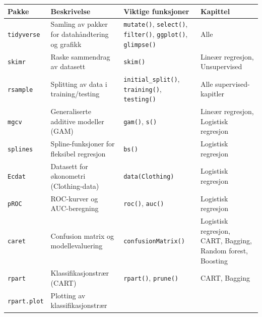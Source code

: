 \documentclass[
  letterpaper,
  DIV=11,
  numbers=noendperiod]{scrreprt}
\begin{document}
\begin{longtable}[]{@{}
  >{\raggedright\arraybackslash}p{}
  >{\raggedright\arraybackslash}p{}
  >{\raggedright\arraybackslash}p{}
  >{\raggedright\arraybackslash}p{}@{}}
\toprule\noalign{}
\begin{minipage}[b]{\linewidth}\raggedright
Pakke
\end{minipage} & \begin{minipage}[b]{\linewidth}\raggedright
Beskrivelse
\end{minipage} & \begin{minipage}[b]{\linewidth}\raggedright
Viktige funksjoner
\end{minipage} & \begin{minipage}[b]{\linewidth}\raggedright
Kapittel
\end{minipage} \\
\midrule\noalign{}
\endhead
\bottomrule\noalign{}
\endlastfoot
\texttt{tidyverse} & Samling av pakker for datahåndtering og grafikk &
\texttt{mutate()}, \texttt{select()}, \texttt{filter()},
\texttt{ggplot()}, \texttt{glimpse()} & Alle \\
\texttt{skimr} & Raske sammendrag av datasett & \texttt{skim()} & Lineær
regresjon, Unsupervised \\
\texttt{rsample} & Splitting av data i training/testing &
\texttt{initial\_split()}, \texttt{training()}, \texttt{testing()} &
Alle supervised-kapitler \\
\texttt{mgcv} & Generaliserte additive modeller (GAM) & \texttt{gam()},
\texttt{s()} & Lineær regresjon, Logistisk regresjon \\
\texttt{splines} & Spline-funksjoner for fleksibel regresjon &
\texttt{bs()} & Logistisk regresjon \\
\texttt{Ecdat} & Datasett for økonometri (Clothing-data) &
\texttt{data(Clothing)} & Logistisk regresjon \\
\texttt{pROC} & ROC-kurver og AUC-beregning & \texttt{roc()},
\texttt{auc()} & Logistisk regresjon \\
\texttt{caret} & Confusion matrix og modellevaluering &
\texttt{confusionMatrix()} & Logistisk regresjon, CART, Bagging, Random
forest, Boosting \\
\texttt{rpart} & Klassifikasjonstrær (CART) & \texttt{rpart()},
\texttt{prune()} & CART, Bagging \\
\texttt{rpart.plot} & Plotting av klassifikasjonstrær &

\end{longtable}
\end{document}
